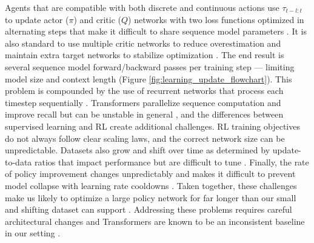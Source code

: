 Agents that are compatible with both discrete and continuous actions use $\tau_{t-l:t}$ to update actor ($\pi$) and critic ($Q$) networks with two loss functions optimized in alternating steps \cite{lillicrap2015continuous, christodoulou2019soft} that make it difficult to share sequence model parameters \cite{ni2022recurrent, yang2021recurrent, yarats2021improving}. It is also standard to use multiple critic networks to reduce overestimation \cite{fujimoto2018addressing, chen2021randomized} and maintain extra target networks to stabilize optimization \cite{mnih2015human}. The end result is several sequence model forward/backward passes per training step --- limiting model size and context length \cite{pleines2022generalization, ni2022recurrent} (Figure \ref{fig:learning_update_flowchart}). This problem is compounded by the use of recurrent networks that process each timestep sequentially \cite{lu2023structured}. Transformers parallelize sequence computation and improve recall but can be unstable in general \cite{xiong2020layer, nguyen2019transformers}, and the differences between supervised learning and RL create additional challenges. RL training objectives do not always follow clear scaling laws, and the correct network size can be unpredictable. Datasets also grow and shift over time as determined by update-to-data ratios that impact performance but are difficult to tune \cite{fedus2020revisiting, d2022sample}. Finally, the rate of policy improvement changes unpredictably and makes it difficult to prevent model collapse with learning rate cooldowns \cite{vaswani2017attention, touvron2023llama}. Taken together, these challenges make us likely to optimize a large policy network for far longer than our small and shifting dataset can support \cite{nikishin2022primacy, abbas2023loss}. Addressing these problems requires careful architectural changes \cite{melo2022transformers, parisotto2020stabilizing} and Transformers are known to be an inconsistent baseline in our setting \cite{mishra2017simple, laskin2022context, team2023human}.